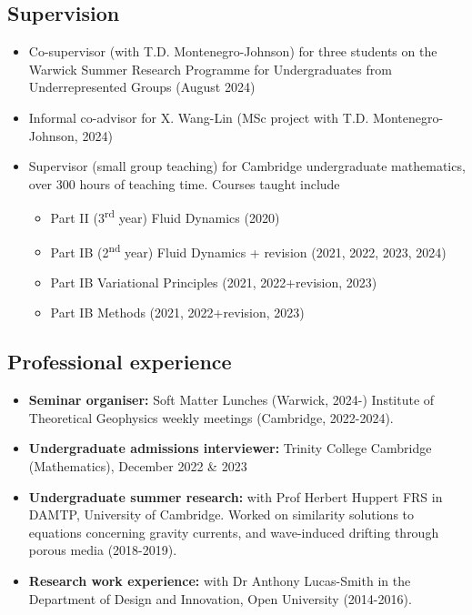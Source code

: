 \documentclass[a4paper]{article}
\begin{document}
\begin{multicols}{2}
        \subsection*{Supervision}
        \begin{itemize}
            \item Co-supervisor (with T.D. Montenegro-Johnson) for three students on the Warwick Summer Research Programme for Undergraduates from Underrepresented Groups (August 2024)
            \item Informal co-advisor for X. Wang-Lin (MSc project with T.D. Montenegro-Johnson, 2024)
            \item Supervisor (small group teaching) for Cambridge undergraduate mathematics, over 300 hours of teaching time. Courses taught include \vspace{-0.5em}
                \begin{small}
                    \begin{itemize}
                        \item Part II (3\textsuperscript{rd} year) Fluid Dynamics (2020)\vspace{-0.5em}
                        \item Part IB (2\textsuperscript{nd} year) Fluid Dynamics + revision (2021, 2022, 2023, 2024)\vspace{-0.5em}
                        \item Part IB Variational Principles (2021, 2022+revision, 2023)\vspace{-0.5em}
                        \item Part IB Methods (2021, 2022+revision, 2023)\vspace{-0.5em}
                    \end{itemize}
                \end{small}
        \end{itemize}
        \newcolumn
        \subsection*{Professional experience}
            \begin{itemize}
                \item \textbf{Seminar organiser:} Soft Matter Lunches (Warwick, 2024-) Institute of Theoretical Geophysics weekly meetings (Cambridge, 2022-2024).
                \item \textbf{Undergraduate admissions interviewer:} Trinity College Cambridge (Mathematics), December 2022 \& 2023
                \item \textbf{Undergraduate summer research:} with Prof Herbert Huppert FRS in DAMTP, University of Cambridge. Worked on similarity solutions to equations concerning gravity currents, and wave-induced drifting through porous media (2018-2019).
                \item \textbf{Research work experience:} with Dr Anthony Lucas-Smith in the Department of Design and Innovation, Open University (2014-2016).
            \end{itemize}

\end{multicols}
\end{document}
